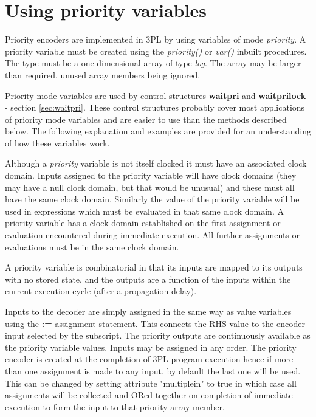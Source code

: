     \section{Using priority variables}\label{usepriorityvariables}

        Priority encoders are implemented in 3PL by using variables of mode {\em
        priority}. A priority variable must be created using the {\em
        priority()} or {\em var()} inbuilt procedures. The type must be a
        one-dimensional array of type {\em log}. The array may be larger than
        required, unused array members being ignored.
        
        Priority mode variables are used by control structures {\bf waitpri} and
        {\bf waitprilock} - section \ref{sec:waitpri}. These
        control structures probably cover most applications of priority mode
        variables and are easier to use than the methods described
        below. The following explanation and examples are provided for an
        understanding of how these variables work.

        Although a {\em priority} variable is not itself clocked it must have an
        associated clock domain. Inputs assigned to the priority variable will
        have clock domains (they may have a null clock domain, but that would be
        unusual) and these must all have the same clock domain. Similarly the
        value of the priority variable will be used in expressions which must be
        evaluated in that same clock domain. A priority variable has a clock
        domain established on the first assignment or evaluation encountered
        during immediate execution. All further assignments or evaluations must
        be in the same clock domain.

        A priority variable is combinatorial in that its inputs are mapped to
        its outputs with no stored state, and the outputs are a function of the
        inputs within the current execution cycle (after a propagation delay).

        Inputs to the decoder are simply assigned in the same way as value
        variables using the {\bf :=} assignment statement. This connects the RHS
        value to the encoder input selected by the subscript. The priority
        outputs are continuously available as the priority variable values.
        Inputs may be assigned in any order. The priority encoder is created at
        the completion of 3PL program execution hence if more than one
        assignment is made to any input, by default the last one will be used.
        This can be changed by setting attribute "multiplein" to true in
        which case all assignments will be collected and ORed together on
        completion of immediate execution to form the input to that priority
        array member.
        
